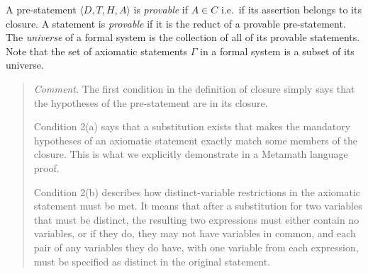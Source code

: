 A pre-statement $\langle D,T,H,A
\rangle$ is {\em provable} if $A\in C$ i.e.\ if its assertion belongs to its
closure.  A statement is {\em provable} if it is
the reduct of a provable pre-statement.
The {\em universe}
of a formal system is
the collection of all of its provable statements.  Note that the
set of axiomatic statements $\Gamma$ in a formal system is a subset of its
universe.

{\footnotesize\begin{quotation}
{\em Comment.} The first condition in the definition of closure simply says
that the hypotheses of the pre-statement are in its closure.

Condition 2(a) says that a substitution exists that makes the
mandatory hypotheses of an axiomatic statement exactly match some members of
the closure.  This is what we explicitly demonstrate in a Metamath language
proof.

%

Condition 2(b) describes how distinct-variable restrictions in the axiomatic
statement must be met.  It means that after a substitution for two variables
that must be distinct, the resulting two expressions must either contain no
variables, or if they do, they may not have variables in common, and each pair
of any variables they do have, with one variable from each expression, must be
specified as distinct in the original statement.
\end{quotation}}

